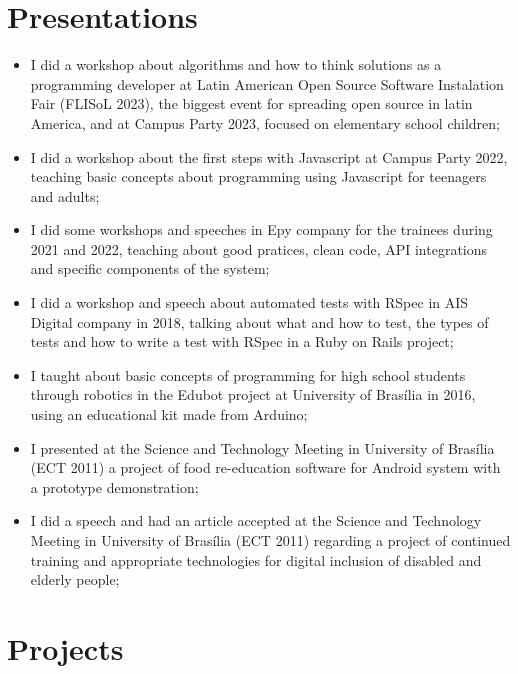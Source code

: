 \section{Presentations}

\begin{itemize}
    \item I did a workshop about algorithms and how to think solutions as a programming developer at Latin American Open Source Software Instalation Fair (FLISoL 2023), the biggest event for spreading open source in latin America, and at Campus Party 2023, focused on elementary school children;
    \item I did a workshop about the first steps with Javascript at Campus Party 2022, teaching basic concepts about programming using Javascript for teenagers and adults;
    \item I did some workshops and speeches in Epy company for the trainees during 2021 and 2022, teaching about good pratices, clean code, API integrations and specific components of the system;
    \item I did a workshop and speech about automated tests with RSpec in AIS Digital company in 2018, talking about what and how to test, the types of tests and how to write a test with RSpec in a Ruby on Rails project;
    \item I taught about basic concepts of programming for high school students through robotics in the Edubot project at University of Brasília in 2016, using an educational kit made from Arduino;
    \item I presented at the Science and Technology Meeting in University of Brasília (ECT 2011) a project of food re-education software for Android system with a prototype demonstration;
    \item I did a speech and had an article accepted at the Science and Technology Meeting in University of Brasília (ECT 2011) regarding a project of continued training and appropriate technologies for digital inclusion of disabled and elderly people; 
\end{itemize}


\section{Projects}

